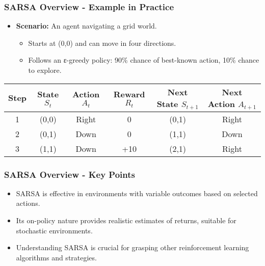\documentclass[aspectratio=169]{beamer}
\begin{document}
\begin{frame}[fragile]
    \frametitle{SARSA Overview - Example in Practice}
    \begin{itemize}
        \item \textbf{Scenario:} An agent navigating a grid world.
        \begin{itemize}
            \item Starts at (0,0) and can move in four directions.
            \item Follows an ε-greedy policy: 90\% chance of best-known action, 10\% chance to explore.
        \end{itemize}
    \end{itemize}
    \begin{table}[ht]
        \centering
        \begin{tabular}{|c|c|c|c|c|c|}
            \hline
            Step & State \( S_t \) & Action \( A_t \) & Reward \( R_t \) & Next State \( S_{t+1} \) & Next Action \( A_{t+1} \) \\
            \hline
            1 & (0,0) & Right & 0 & (0,1) & Right \\
            2 & (0,1) & Down & 0 & (1,1) & Down \\
            3 & (1,1) & Down & +10 & (2,1) & Right \\
            \hline
        \end{tabular}
    \end{table}
\end{frame}

\begin{frame}[fragile]
    \frametitle{SARSA Overview - Key Points}
    \begin{itemize}
        \item SARSA is effective in environments with variable outcomes based on selected actions.
        \item Its on-policy nature provides realistic estimates of returns, suitable for stochastic environments.
        \item Understanding SARSA is crucial for grasping other reinforcement learning algorithms and strategies.
    \end{itemize}
\end{frame}
\end{document}
